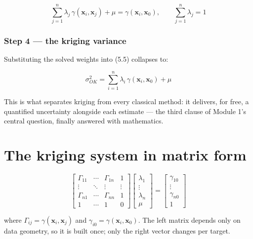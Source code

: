 \documentclass[11pt]{article}
\begin{document}
\begin{eqbox}
\[ \sum_{j=1}^{n}\lambda_j\,\gamma(\mathbf{x}_i,\mathbf{x}_j)+\mu
   =\gamma(\mathbf{x}_i,\mathbf{x}_0),\qquad
   \sum_{j=1}^{n}\lambda_j=1 \tag{5.7}\]
\end{eqbox}

\subsubsection*{Step 4 --- the kriging variance}

Substituting the solved weights into (5.5) collapses to:

\begin{eqbox}
\[ \sigma_{OK}^{2} = \sum_{i=1}^{n}\lambda_i\,\gamma(\mathbf{x}_i,
   \mathbf{x}_0)+\mu \tag{5.8}\]
\end{eqbox}

This is what separates kriging from every classical method: it delivers,
for free, a quantified uncertainty alongside each estimate --- the third
clause of Module 1's central question, finally answered with mathematics.

\section{The kriging system in matrix form}

\begin{eqbox}
\[ \begin{bmatrix}
   \Gamma_{11}&\cdots&\Gamma_{1n}&1\\
   \vdots&\ddots&\vdots&\vdots\\
   \Gamma_{n1}&\cdots&\Gamma_{nn}&1\\
   1&\cdots&1&0\end{bmatrix}
   \begin{bmatrix}\lambda_1\\\vdots\\\lambda_n\\\mu\end{bmatrix}
   =\begin{bmatrix}\gamma_{10}\\\vdots\\\gamma_{n0}\\1\end{bmatrix}
   \tag{5.9}\]
\end{eqbox}

where $\Gamma_{ij}=\gamma(\mathbf{x}_i,\mathbf{x}_j)$ and
$\gamma_{i0}=\gamma(\mathbf{x}_i,\mathbf{x}_0)$. The left matrix depends
only on data geometry, so it is built once; only the right vector
changes per target.
\end{document}
